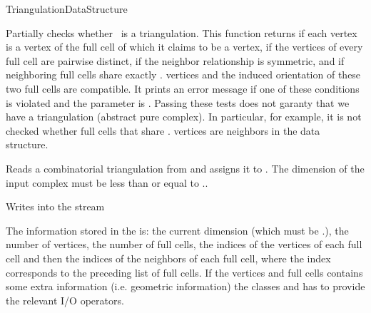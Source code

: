 \begin{ccRefConcept}{TriangulationDataStructure}
\begin{ccAdvanced}
\end{ccAdvanced}


{Partially checks whether \ccVar\ is a triangulation. This function
returns  if each vertex is a vertex of the full cell of which it
claims to be a vertex, if the vertices of every full cell are pairwise distinct,
if the neighbor relationship is symmetric, and if neighboring full cells share
exactly \ccVar. vertices and the induced
orientation of these two full cells are compatible.
 It prints an error message
if one of these conditions is violated and the  parameter is
. Passing these tests does not garanty that we have a
triangulation (abstract pure
complex). In particular, for example, it is not
checked whether full cells that share \ccVar. vertices
are neighbors in the data structure.}


{Reads a combinatorial triangulation from  and assigns it to
. \ccPrecond The dimension of the input complex must be less than or
equal to \ccVar..}

{Writes  into the stream }

The information stored in the  is: the current dimension (which
must be \ccc{<=} \ccVar.), the number of vertices,
the number of full cells, the indices of the vertices of each full cell and then the
indices of the neighbors of each full cell, where the index corresponds to the
preceding list of full cells.
If the  vertices and full cells contains some extra information
(i.e. geometric information) the classes  and
 has to provide the relevant I/O operators.


\ccSeeAlso

\\

\end{ccRefConcept}
